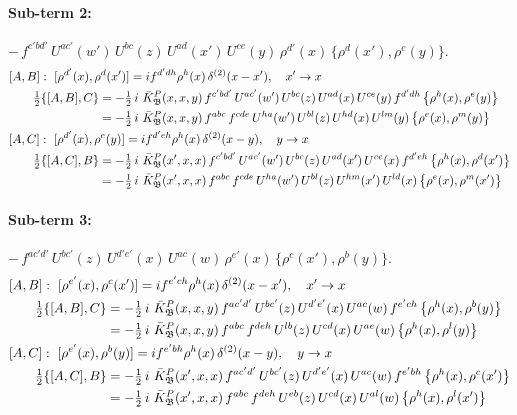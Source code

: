 \documentclass[10pt]{article}
\numberwithin{equation}{section}
\begin{document}
\paragraph{Sub-term 2:} $-\,f^{c'bd'}\,U^{ac'}(w')\,U^{bc}(z)\,U^{ad}(x')\,U^{ce}(y)\,\rho^{d'}(x)\,\big\{\rho^{d}(x'),\rho^{e}(y)\big\}$.
\begin{align}
&[A,B]:\ [\rho^{d'}(x),\rho^{d}(x')]=i f^{d'dh}\rho^{h}(x)\,\delta^{(2)}(x-x'),\quad x'\to x\notag\\
&\qquad \tfrac12\{[A,B],C\}=-\tfrac12\,i\,\,\bar K^{P}_{\mathfrak B}(x,x,y)\,f^{c'bd'}\,U^{ac'}(w')\,U^{bc}(z)\,U^{ad}(x)\,U^{ce}(y)\,f^{d'dh}\,\big\{\rho^{h}(x),\rho^{e}(y)\big\}\notag\\
&\qquad\phantom{\tfrac12\{[A,B],C\}}=-\tfrac12\,i\,\,\bar K^{P}_{\mathfrak B}(x,x,y)\,f^{abc}\,f^{cde}\,U^{ha}(w')\,U^{bl}(z)\,U^{hd}(x)\,U^{lm}(y)\,\big\{\rho^{e}(x),\rho^{m}(y)\big\}
\label{eq:GII.I2.P-2-AB}\\
&[A,C]:\ [\rho^{d'}(x),\rho^{e}(y)]=i f^{d'eh}\rho^{h}(x)\,\delta^{(2)}(x-y),\quad y\to x\notag\\
&\qquad \tfrac12\{[A,C],B\}=-\tfrac12\,i\,\,\bar K^{P}_{\mathfrak B}(x',x,x)\,f^{c'bd'}\,U^{ac'}(w')\,U^{bc}(z)\,U^{ad}(x')\,U^{ce}(x)\,f^{d'eh}\,\big\{\rho^{h}(x),\rho^{d}(x')\big\}\notag\\
&\qquad\phantom{\tfrac12\{[A,C],B\}}=-\tfrac12\,i\,\,\bar K^{P}_{\mathfrak B}(x',x,x)\,f^{abc}\,f^{cde}\,U^{ha}(w')\,U^{bl}(z)\,U^{hm}(x')\,U^{ld}(x)\,\big\{\rho^{e}(x),\rho^{m}(x')\big\}
\label{eq:GII.I2.P-2-AC}
\end{align}
\paragraph{Sub-term 3:} $-\,f^{ac'd'}\,U^{bc'}(z)\,U^{d'e'}(x)\,U^{ac}(w)\,\rho^{e'}(x)\,\big\{\rho^{c}(x'),\rho^{b}(y)\big\}$.
\begin{align}
&[A,B]:\ [\rho^{e'}(x),\rho^{c}(x')]=i f^{e'ch}\rho^{h}(x)\,\delta^{(2)}(x-x'),\quad x'\to x\notag\\
&\qquad \tfrac12\{[A,B],C\}=-\tfrac12\,i\,\,\bar K^{P}_{\mathfrak B}(x,x,y)\,f^{ac'd'}\,U^{bc'}(z)\,U^{d'e'}(x)\,U^{ac}(w)\,f^{e'ch}\,\big\{\rho^{h}(x),\rho^{b}(y)\big\}\notag\\
&\qquad\phantom{\tfrac12\{[A,B],C\}}=-\tfrac12\,i\,\,\bar K^{P}_{\mathfrak B}(x,x,y)\,f^{abc}\,f^{deh}\,U^{lb}(z)\,U^{cd}(x)\,U^{ae}(w)\,\big\{\rho^{h}(x),\rho^{l}(y)\big\}
\label{eq:GII.I2.P-3-AB}\\
&[A,C]:\ [\rho^{e'}(x),\rho^{b}(y)]=i f^{e'bh}\rho^{h}(x)\,\delta^{(2)}(x-y),\quad y\to x\notag\\
&\qquad \tfrac12\{[A,C],B\}=-\tfrac12\,i\,\,\bar K^{P}_{\mathfrak B}(x',x,x)\,f^{ac'd'}\,U^{bc'}(z)\,U^{d'e'}(x)\,U^{ac}(w)\,f^{e'bh}\,\big\{\rho^{h}(x),\rho^{c}(x')\big\}\notag\\
&\qquad\phantom{\tfrac12\{[A,C],B\}}=-\tfrac12\,i\,\,\bar K^{P}_{\mathfrak B}(x',x,x)\,f^{abc}\,f^{deh}\,U^{eb}(z)\,U^{cd}(x)\,U^{al}(w)\,\big\{\rho^{h}(x),\rho^{l}(x')\big\}
\label{eq:GII.I2.P-3-AC}
\end{align}
\end{document}
